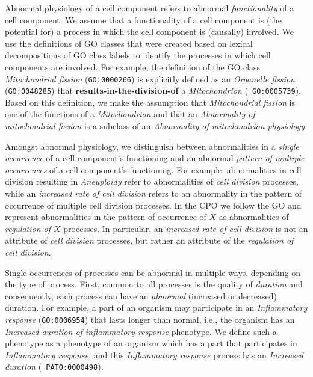\documentclass{bioinfo}
\renewcommand{\cite}{\citep}
\begin{document}
Abnormal physiology of a cell component refers to abnormal {\em
  functionality} of a cell component. We assume that a functionality
of a cell component is (the potential for) a process in which the cell
component is (causally) involved. We use the definitions of GO classes
that were created based on lexical decompositions of GO class labels
\cite{Mungall2010go, Bada2007a, Ogren2004} to identify the processes
in which cell components are involved. For example, the definition of
the GO class {\em Mitochondrial fission} ({\tt GO:0000266}) is
explicitly defined as an {\em Organelle fission} ({\tt GO:0048285})
that {\bf results-in-the-division-of} a {\em Mitochondrion} ({\tt
  GO:0005739}). Based on this definition, we make the assumption that
{\em Mitochondrial fission} is one of the functions of a {\em
  Mitochondrion} and that an {\em Abnormality of mitochondrial
  fission} is a subclass of an {\em Abnormality of mitochondrion
  physiology}.

Amongst abnormal physiology, we distinguish between abnormalities in a
{\em single occurrence} of a cell component's functioning and an
abnormal {\em pattern of multiple occurrences} of a cell component's
functioning. For example, abnormalities in cell division resulting in
{\em Aneuploidy} refer to abnormalities of {\em cell division}
processes, while an {\em increased rate of cell division} refers to an
abnormality in the pattern of occurrence of multiple cell division
processes. In the CPO we follow the GO and represent abnormalities in
the pattern of occurrence of $X$ as abnormalities of {\em regulation
  of $X$} processes. In particular, an {\em increased rate of cell
  division} is not an attribute of {\em cell division} processes, but
rather an attribute of the {\em regulation of cell division}.

Single occurrences of processes can be abnormal in multiple ways,
depending on the type of process.
%
First, common to all processes is the quality of {\em duration} and
consequently, each process can have an {\em abnormal} (increased or
decreased) duration. For example, a part of an organism may
participate in an {\em Inflammatory response} ({\tt GO:0006954}) that
lasts longer than normal, i.e., the organism has an {\em Increased
  duration of inflammatory response} phenotype. We define such a
phenotype as a phenotype of an organism which has a part that
participates in {\em Inflammatory response}, and this {\em
  Inflammatory response} process has an {\em Increased duration} ({\tt
  PATO:0000498}).
\end{document}
